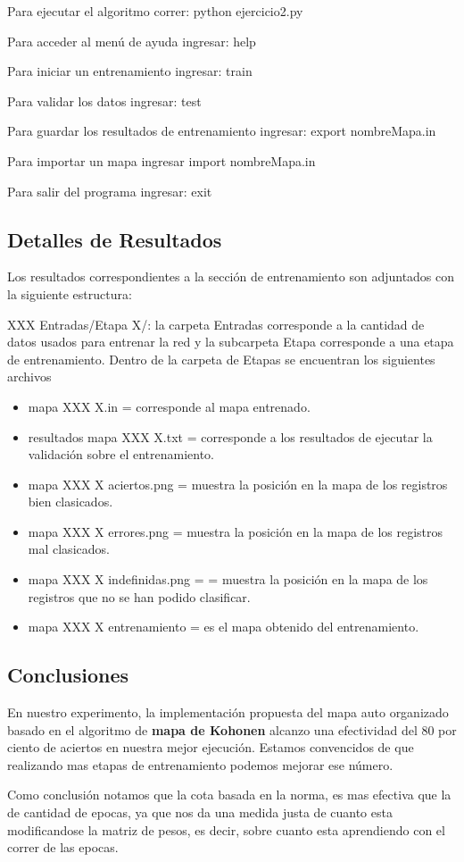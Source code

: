 Para ejecutar el algoritmo correr: python ejercicio2.py

Para acceder al menú de ayuda ingresar: help

Para iniciar un entrenamiento ingresar: train

Para validar los datos ingresar: test

Para guardar los resultados de entrenamiento ingresar: export nombreMapa.in

Para importar un mapa ingresar import nombreMapa.in

Para salir del programa ingresar: exit


\subsection{Detalles de Resultados}

Los resultados correspondientes a la sección de entrenamiento son adjuntados con 
la siguiente estructura:

XXX Entradas/Etapa X/: la carpeta Entradas corresponde a la cantidad de datos usados para entrenar la red
y la subcarpeta Etapa corresponde a una etapa de entrenamiento. Dentro de la carpeta de
Etapas se encuentran los siguientes archivos

\begin{itemize}
	\item mapa XXX X.in =  corresponde al mapa entrenado.
	\item resultados mapa XXX X.txt = corresponde a los resultados de ejecutar la
validación sobre el entrenamiento.
	\item mapa XXX X aciertos.png = muestra la posición en la mapa de los registros bien clasicados.
	\item mapa XXX X errores.png = muestra la posición en la mapa de los registros mal clasicados.
	\item mapa XXX X indefinidas.png = = muestra la posición en la mapa de los registros que no
se han podido clasificar.
	\item mapa XXX X entrenamiento = es el mapa obtenido del entrenamiento.
\end{itemize}

\subsection{Conclusiones}

En nuestro experimento, la implementación propuesta del mapa auto organizado basado en el algoritmo
de \textbf{mapa de Kohonen} alcanzo una efectividad del 80 por ciento de aciertos en nuestra mejor
ejecución.
Estamos convencidos de que realizando mas etapas de entrenamiento podemos mejorar ese número.

Como conclusión notamos que la cota basada en la norma, es mas efectiva que la de cantidad de epocas,
ya que nos da una medida justa de cuanto esta modificandose la matriz de pesos, es decir, sobre cuanto
esta aprendiendo con el correr de las epocas.













